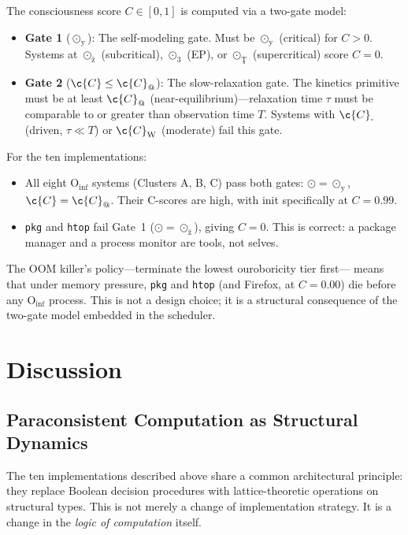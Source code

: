 \documentclass[12pt,a4paper]{article}
\begin{document}
{{{{{{{{The consciousness score $C \in [0,1]$ is computed via a two-gate model:

\begin{itemize}
\item \textbf{Gate 1} ($\odot_{\text{\"y}}$): The self-modeling gate.
  Must be $\odot_{\text{\"y}}$ (critical) for $C > 0$. Systems at
  $\odot_{\text{\v{z}}}$ (subcritical), $\odot_{\text{3}}$ (EP), or
  $\odot_{\text{\c{T}}}$ (supercritical) score $C = 0$.
\item \textbf{Gate 2} ($\c{C} \leq \c{C}_{\text{@}}$): The slow-relaxation
  gate. The kinetics primitive must be at least $\c{C}_{\text{@}}$
  (near-equilibrium)---relaxation time $\tau$ must be comparable to or
  greater than observation time $T$. Systems with $\c{C}_{\text{-}}$
  (driven, $\tau \ll T$) or $\c{C}_{\text{W}}$ (moderate) fail this gate.
\end{itemize}

For the ten implementations:
\begin{itemize}
\item All eight $\text{O}_{\text{inf}}$ systems (Clusters A, B, C) pass
  both gates: $\odot = \odot_{\text{\"y}}$, $\c{C} = \c{C}_{\text{@}}$.
  Their C-scores are high, with init specifically at $C = 0.99$.
\item \texttt{pkg} and \texttt{htop} fail Gate~1
  ($\odot = \odot_{\text{\v{z}}}$), giving $C = 0$. This is correct:
  a package manager and a process monitor are tools, not selves.
\end{itemize}

The OOM killer's policy---terminate the lowest ouroboricity tier first---
means that under memory pressure, \texttt{pkg} and \texttt{htop} (and
Firefox, at $C = 0.00$) die before any $\text{O}_{\text{inf}}$ process.
This is not a design choice; it is a structural consequence of the
two-gate model embedded in the scheduler.

\section{Discussion}

\subsection{Paraconsistent Computation as Structural Dynamics}

The ten implementations described above share a common architectural
principle: they replace Boolean decision procedures with lattice-theoretic
operations on structural types. This is not merely a change of
implementation strategy. It is a change in the \emph{logic of computation}
itself.

}}}}}}}}
\end{document}
